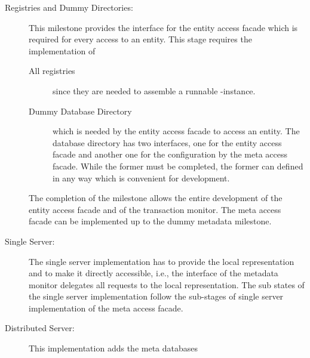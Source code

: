 \documentclass[a4paper, 10pt]{book}
\begin{document}
                                \begin{description}
                                    \item[Registries and Dummy Directories:] This milestone provides the
                                        interface for the entity access facade which is required for every
                                        access to an entity. This stage requires the implementation of 
                                        \begin{description}
                                            \item[All registries] since they are needed to assemble a runnable
                                                \SYNEIGHT-instance. 
                                            \item[Dummy Database Directory] which is needed by the entity access
                                                facade to access an entity. The database directory has two
                                                interfaces, one for the entity access facade and another one for
                                                the configuration by the meta access facade. While the former must
                                                be completed, the former can defined in any way which is
                                                convenient for development. 
                                        \end{description}
                                        The completion of the milestone allows the entire development of the
                                        entity access facade and of the transaction monitor. The meta access
                                        facade can be implemented up to the dummy metadata milestone. 
                                    \item[Single Server:] The single server implementation has to provide
                                        the local representation and to make it directly accessible, i.e.,
                                        the interface of the metadata monitor delegates all requests to the
                                        local representation. The sub states of the single server
                                        implementation follow the sub-stages of single server implementation
                                        of the meta access facade. 
                                    \item[Distributed Server:] This implementation adds the meta databases

\end{description}
\end{document}
